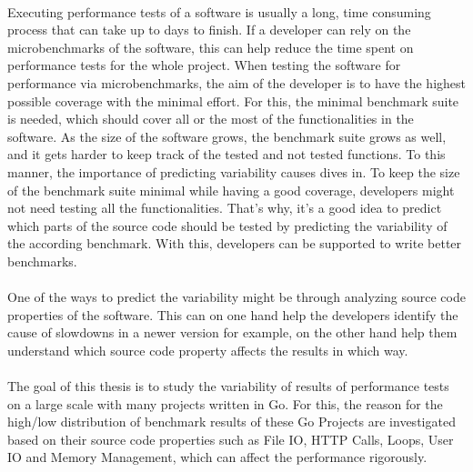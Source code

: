 \documentclass{seal_thesis}
\begin{document}
\\
Executing performance tests of a software is usually a long, time consuming process that can take up to days to finish. If a developer can rely on the microbenchmarks of the software, this can help reduce the time spent on performance tests for the whole project. When testing the software for performance via microbenchmarks, the aim of the developer is to have the highest possible coverage  with the minimal effort. For this, the minimal benchmark suite is needed, which should cover all or the most of the functionalities in the software. As the size of the software grows, the benchmark suite grows as well, and it gets harder to keep track of the tested and not tested functions. To this manner, the importance of predicting variability causes dives in. To keep the size of the benchmark suite minimal while having a good coverage, developers might not need testing all the functionalities. That's why, it's a good idea to predict which parts of the source code should be tested by predicting the variability of the according benchmark. With this, developers can be supported to write better benchmarks.\\
\\
One of the ways to predict the variability might be through analyzing source code properties of the software. This can on one hand help the developers identify the cause of slowdowns in a newer version for example, on the other hand help them understand which source code property affects the
results in which way.\\
\\
The goal of this thesis is to study the variability of results of performance tests on a large scale with many projects written in Go. For this, the reason for the high/low distribution of benchmark results of these Go Projects are investigated based on their source code properties such as File IO, HTTP Calls, Loops, User IO and Memory Management, which can affect the performance rigorously.
\end{document}
